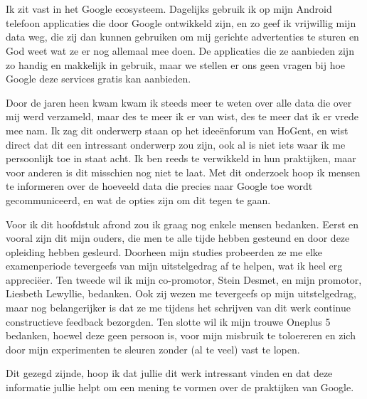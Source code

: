 
\chapter*{}
\label{ch:voorwoord}


Ik zit vast in het Google ecosysteem. Dagelijks gebruik ik op mijn Android telefoon applicaties die door Google ontwikkeld zijn, en zo geef ik vrijwillig mijn data weg, die zij dan kunnen gebruiken om mij gerichte advertenties te sturen en God weet wat ze er nog allemaal mee doen. De applicaties die ze aanbieden zijn zo handig en makkelijk in gebruik, maar we stellen er ons geen vragen bij hoe Google deze services gratis kan aanbieden. 

Door de jaren heen kwam kwam ik steeds meer te weten over alle data die over mij werd verzameld, maar des te meer ik er van wist, des te meer dat ik er vrede mee nam. Ik zag dit onderwerp staan op het ideeënforum van HoGent, en wist direct dat dit een intressant onderwerp zou zijn, ook al is niet iets waar ik me persoonlijk toe in staat acht. Ik ben reeds te verwikkeld in hun praktijken, maar voor anderen is dit misschien nog niet te laat. Met dit onderzoek hoop ik mensen te informeren over de hoeveeld data die precies naar Google toe wordt gecommuniceerd, en wat de opties zijn om dit tegen te gaan.

Voor ik dit hoofdstuk afrond zou ik graag nog enkele mensen bedanken. Eerst en vooral zijn dit mijn ouders, die men te alle tijde hebben gesteund en door deze opleiding hebben gesleurd. Doorheen mijn studies probeerden ze me elke examenperiode tevergeefs van mijn uitstelgedrag af te helpen, wat ik heel erg appreciëer. Ten tweede wil ik mijn co-promotor, Stein Desmet, en mijn promotor, Liesbeth Lewyllie, bedanken. Ook zij wezen me tevergeefs op mijn uitstelgedrag, maar nog belangerijker is dat ze me tijdens het schrijven van dit werk continue constructieve feedback bezorgden. Ten slotte wil ik mijn trouwe Oneplus 5 bedanken, hoewel deze geen persoon is, voor mijn misbruik te toloereren en zich door mijn experimenten te sleuren zonder (al te veel) vast te lopen.

Dit gezegd zijnde, hoop ik dat jullie dit werk intressant vinden en dat deze informatie jullie helpt om een mening te vormen over de praktijken van Google.

